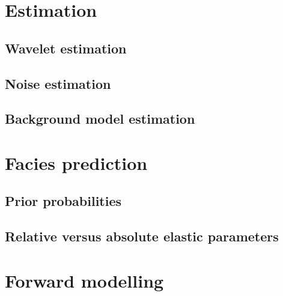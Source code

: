 \section{Estimation}
\subsection{Wavelet estimation}
\subsection{Noise estimation}
\subsection{Background model estimation}
\section{Facies prediction}
\subsection{Prior probabilities}
\subsection{Relative versus absolute elastic parameters}
\section{Forward modelling}
